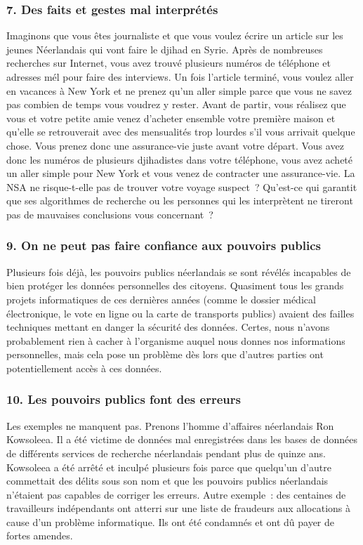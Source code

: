 \subsubsection{7. Des faits et gestes mal interprétés}
Imaginons que vous êtes journaliste et que vous voulez écrire un article sur les jeunes Néerlandais qui vont faire le djihad en Syrie. Après de nombreuses recherches sur Internet, vous avez trouvé plusieurs numéros de téléphone et adresses mél pour faire des interviews. Un fois l'article terminé, vous voulez aller en vacances à New York et ne prenez qu'un aller simple parce que vous ne savez pas combien de temps vous voudrez y rester. Avant de partir, vous réalisez que vous et votre petite amie venez d'acheter ensemble votre première maison et qu'elle se retrouverait avec des mensualités trop lourdes s'il vous arrivait quelque chose. Vous prenez donc une assurance-vie juste avant votre départ. Vous avez donc les numéros de plusieurs djihadistes dans votre téléphone, vous avez acheté un aller simple pour New York et vous venez de contracter une assurance-vie. La NSA ne risque-t-elle pas de trouver votre voyage suspect ? Qu'est-ce qui garantit que ses algorithmes de recherche ou les personnes qui les interprètent ne tireront pas de mauvaises conclusions vous concernant ?

\subsubsection{9. On ne peut pas faire confiance aux pouvoirs publics}
Plusieurs fois déjà, les pouvoirs publics néerlandais se sont révélés incapables de bien protéger les données personnelles des citoyens. Quasiment tous les grands projets informatiques de ces dernières années (comme le dossier médical électronique, le vote en ligne ou la carte de transports publics) avaient des failles techniques mettant en danger la sécurité des données. Certes, nous n'avons probablement rien à cacher à l'organisme auquel nous donnes nos informations personnelles, mais cela pose un problème dès lors que d'autres parties ont potentiellement accès à ces données.

\subsubsection{10. Les pouvoirs publics font des erreurs}
Les exemples ne manquent pas. Prenons l'homme d'affaires néerlandais Ron Kowsoleea. Il a été victime de données mal enregistrées dans les bases de données de différents services de recherche néerlandais pendant plus de quinze ans. Kowsoleea a été arrêté et inculpé plusieurs fois parce que quelqu'un d'autre commettait des délits sous son nom et que les pouvoirs publics néerlandais n'étaient pas capables de corriger les erreurs.
Autre exemple : des centaines de travailleurs indépendants ont atterri sur une liste de fraudeurs aux allocations à cause d'un problème informatique. Ils ont été condamnés et ont dû payer de fortes amendes.

